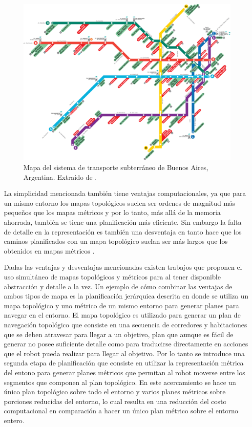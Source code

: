 \begin{figure}[H]
  \center
  \includegraphics[width=1\linewidth]{imagenes/metroBsAs.png}
  \caption[Mapa del sistema de transporte subterráneo de Buenos Aires, Argentina.]{Mapa del sistema de transporte subterráneo de Buenos Aires, Argentina. Extraído de \cite{metroBsAs}.}\label{fig:metroBsAs}
\end{figure} 

La simplicidad mencionada también tiene ventajas computacionales, ya que para un mismo entorno los mapas topológicos suelen ser ordenes de magnitud más pequeños que los mapas métricos y por lo tanto, más allá de la memoria ahorrada, también se tiene una planificación más eficiente. Sin embargo la falta de detalle en la representación es también una desventaja en tanto hace que los caminos planificados con un mapa topológico suelan ser más largos que los obtenidos en mapas métricos \cite{Thrun1998}.

Dadas las ventajas y desventajas mencionadas existen trabajos
\cite{Thrun1998,wurm2008coordinated,Liu2015} que proponen el uso simultáneo de
mapas topológicos y métricos para  al
tener disponible abstracción y detalle a la vez. Un ejemplo de cómo combinar
las ventajas de ambos tipos de mapa es la planificación jerárquica descrita en
\cite{Thrun1998} donde se utiliza un mapa topológico y uno métrico de un mismo
entorno para generar planes para navegar en el entorno. El mapa topológico es
utilizado para generar un plan de navegación topológico que consiste en una
secuencia de corredores y habitaciones que se deben atravesar para llegar a un
objetivo, plan que aunque es fácil de generar no posee suficiente detalle como
para traducirse directamente en acciones que el robot pueda realizar para
llegar al objetivo. Por lo tanto se introduce una segunda etapa de
planificación que consiste en utilizar la representación métrica del entono
para generar planes métricos que permitan al robot moverse entre los segmentos
que componen al plan topológico. En este acercamiento se hace un único plan
topológico sobre todo el entorno y varios planes métricos sobre porciones
reducidas del entorno, lo cual resulta en una reducción del costo computacional
en comparación a hacer un único plan métrico sobre el entorno entero.

